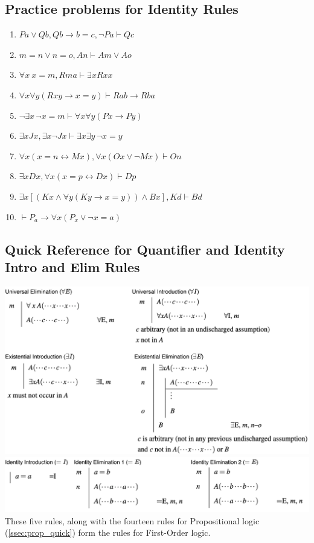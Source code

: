 \subsection{Practice problems for Identity Rules}
\label{subsec:IdentityExercises}
\begin{enumerate}
    \item $Pa \lor Qb, Qb \to b = c, \neg Pa \vdash Qc$
    \item $m = n \lor n = o, An \vdash Am \lor Ao$
    \item $\forall x \ x = m, Rma \vdash \exists x Rxx$
    \item $\forall x \forall y (Rxy \rightarrow x = y) \vdash R{ab} \to R{ba}$
    \item $\neg \exists x \, \neg x = m \vdash \forall x \forall y (Px \to Py)$
    \item $\exists x Jx, \exists x \neg Jx \vdash \exists x \exists y \, \neg x = y$
    \item $\forall x (x = n \leftrightarrow Mx), \forall x (Ox \lor \neg Mx) \vdash On$
    \item $\exists x Dx, \forall x (x = p \leftrightarrow Dx) \vdash Dp$
    \item $\exists x [(Kx \wedge \forall y (Ky \to x = y)) \wedge Bx], Kd \vdash Bd$
    \item $\vdash P_a \to \forall x (P_x \lor \neg x = a)$
\end{enumerate}
\newpage
\begin{center}
    \subsection{Quick Reference for Quantifier and Identity Intro and Elim Rules} \vspace{0.3in}
    \label{ssec:quant_quick}
    \includegraphics[width=1.1\textwidth]{Figures/Quant_rules_no_background.png} \\  \vspace{0.3in} \steezybreak 
    \includegraphics[width=1.1\textwidth]{Figures/Identity_rules_no_background.png} \\ \steezybreak
    These five rules, along with the fourteen rules for Propositional logic (\ref{ssec:prop_quick}) form the rules for First-Order logic.
\end{center}
\newpage
